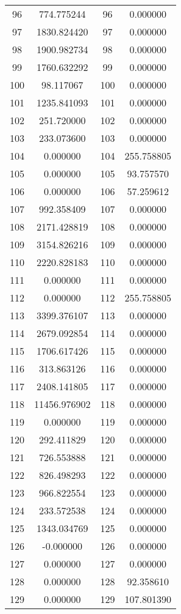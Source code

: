 \documentclass[12pt]{article}
\begin{document}
\begin{longtable}{@{}cccc@{}}
96 & 774.775244 & 96 & 0.000000 \\
97 & 1830.824420 & 97 & 0.000000 \\
98 & 1900.982734 & 98 & 0.000000 \\
99 & 1760.632292 & 99 & 0.000000 \\
100 & 98.117067 & 100 & 0.000000 \\
101 & 1235.841093 & 101 & 0.000000 \\
102 & 251.720000 & 102 & 0.000000 \\
103 & 233.073600 & 103 & 0.000000 \\
104 & 0.000000 & 104 & 255.758805 \\
105 & 0.000000 & 105 & 93.757570 \\
106 & 0.000000 & 106 & 57.259612 \\
107 & 992.358409 & 107 & 0.000000 \\
108 & 2171.428819 & 108 & 0.000000 \\
109 & 3154.826216 & 109 & 0.000000 \\
110 & 2220.828183 & 110 & 0.000000 \\
111 & 0.000000 & 111 & 0.000000 \\
112 & 0.000000 & 112 & 255.758805 \\
113 & 3399.376107 & 113 & 0.000000 \\
114 & 2679.092854 & 114 & 0.000000 \\
115 & 1706.617426 & 115 & 0.000000 \\
116 & 313.863126 & 116 & 0.000000 \\
117 & 2408.141805 & 117 & 0.000000 \\
118 & 11456.976902 & 118 & 0.000000 \\
119 & 0.000000 & 119 & 0.000000 \\
120 & 292.411829 & 120 & 0.000000 \\
121 & 726.553888 & 121 & 0.000000 \\
122 & 826.498293 & 122 & 0.000000 \\
123 & 966.822554 & 123 & 0.000000 \\
124 & 233.572538 & 124 & 0.000000 \\
125 & 1343.034769 & 125 & 0.000000 \\
126 & -0.000000 & 126 & 0.000000 \\
127 & 0.000000 & 127 & 0.000000 \\
128 & 0.000000 & 128 & 92.358610 \\
129 & 0.000000 & 129 & 107.801390 \\

\end{longtable}
\end{document}
